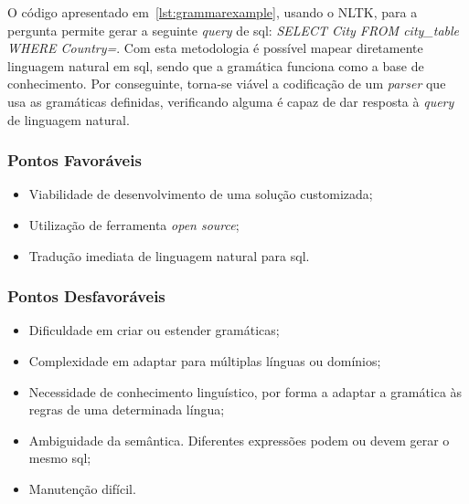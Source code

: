 O código apresentado em~\ref{lst:grammarexample}, usando o NLTK, para a pergunta  permite gerar a seguinte \textit{query} de \gls{sql}: \textit{SELECT City FROM city\_table WHERE Country=}. Com esta metodologia é possível mapear diretamente linguagem natural em \gls{sql}, sendo que a gramática funciona como a base de conhecimento. Por conseguinte, torna-se viável a codificação de um \textit{parser} que usa as gramáticas definidas, verificando
alguma é capaz de dar resposta à \textit{query} de linguagem natural.

\subsubsection*{Pontos Favoráveis}
\begin{itemize}
    \item 
    {
        Viabilidade de desenvolvimento de uma solução customizada;
    }
    \item
    {
        Utilização de ferramenta \textit{open source};
    }
    \item 
    {
        Tradução imediata de linguagem natural para \gls{sql}. 
    }
\end{itemize}

\subsubsection*{Pontos Desfavoráveis}
\begin{itemize}
    \item 
    {
        Dificuldade em criar ou estender gramáticas;
    }
    \item
    {
        Complexidade em adaptar para múltiplas línguas ou domínios;
    }
    \item
    {
        Necessidade de conhecimento linguístico, por forma a adaptar a gramática às regras de uma determinada língua;
    }
    \item
    {
        Ambiguidade da semântica. Diferentes expressões podem ou devem gerar o mesmo \gls{sql};
    }
    \item
    {
        Manutenção difícil.
    }
\end{itemize}

